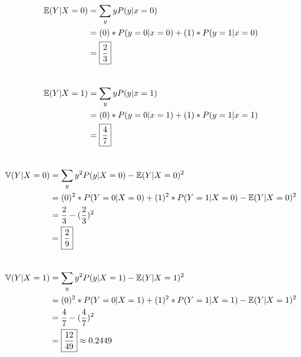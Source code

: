 \documentclass[12pt, fullpage,letterpaper]{article}
\begin{document}
\begin{enumerate}
\begin{enumerate}
\begin{enumerate}
            	\[
            		\begin{split}
            			\mathbb{E}(Y|X=0) &= \sum_y y P(y|x=0)
            				\\
            				&= (0) * P(y=0 | x=0) + (1)*P(y=1|x=0)
            				\\
            				&= \boxed{\frac{2}{3}}
            				\\
            		\end{split}
            	\]
            	\\
            	
            	\[
            		\begin{split}
            			\mathbb{E}(Y|X=1) &= \sum_y y P(y|x=1)
            				\\
            				&= (0) * P(y=0 | x=1) + (1)*P(y=1|x=1)
            				\\
            				&= \boxed{\frac{4}{7}}
            				\\
            		\end{split}
            	\]
            	\\
            	
            	\[
            		\begin{split}
            			\mathbb{V}(Y|X=0) &= \sum_y y^2 P(y|X=0) - \mathbb{E}(Y|X=0)^2
            				\\
            				&= (0)^2 * P(Y=0|X=0) + (1)^2 * P(Y=1|X=0) - \mathbb{E}(Y|X=0)^2
            				\\
            				&= \frac{2}{3} - (\frac{2}{3})^2
            				\\
            				&= \boxed{\frac{2}{9}}
            				\\
            		\end{split}
           	 	\]
            	\\
            	\[
            		\begin{split}
            			\mathbb{V}(Y|X=1) &= \sum_y y^2 P(y|X=1) - \mathbb{E}(Y|X=1)^2
            				\\
            				&= (0)^2 * P(Y=0|X=1) + (1)^2 * P(Y=1|X=1) - \mathbb{E}(Y|X=1)^2
            				\\
            				&= \frac{4}{7} - (\frac{4}{7})^2
            				\\
            				&= \boxed{\frac{12}{49}} \approx 0.2449
            				\\
            		\end{split}
           	 	\]
            	\\
            

\end{enumerate}
\end{enumerate}
\end{enumerate}
\end{document}

